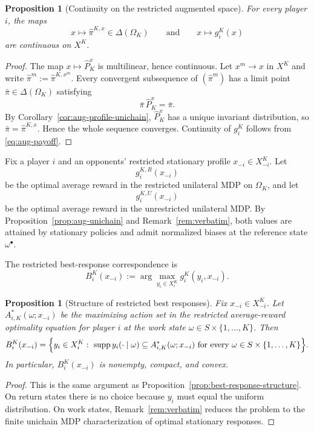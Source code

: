 \documentclass[11pt]{article}
\newtheorem{proposition}[theorem]{Proposition}
\theoremstyle{definition}
\newcommand{\1}{\mathbf{1}}
\DeclareMathOperator{\supp}{supp}
\begin{document}
\begin{proposition}[Continuity on the restricted augmented space]\label{prop:aug-continuity}
For every player $i$, the maps
\[
x\longmapsto \widehat\pi^{K,x}\in\Delta(\Omega_K)
\qquad\text{and}\qquad
x\longmapsto g_i^K(x)
\]
are continuous on $X^K$.
\end{proposition}

\begin{proof}
The map $x\mapsto \widehat P_K^x$ is multilinear, hence continuous. Let $x^m\to x$ in $X^K$ and write $\widehat\pi^m:=\widehat\pi^{K,x^m}$. Every convergent subsequence of $(\widehat\pi^m)$ has a limit point $\bar\pi\in\Delta(\Omega_K)$ satisfying
\[
\bar\pi\,\widehat P_K^x=\bar\pi.
\]
By Corollary~\ref{cor:aug-profile-unichain}, $\widehat P_K^x$ has a unique invariant distribution, so $\bar\pi=\widehat\pi^{K,x}$. Hence the whole sequence converges. Continuity of $g_i^K$ follows from \eqref{eq:aug-payoff}.
\end{proof}

Fix a player $i$ and an opponents' restricted stationary profile $x_{-i}\in X_{-i}^K$. Let
\[
g_i^{K,R}(x_{-i})
\]
be the optimal average reward in the restricted unilateral MDP on $\Omega_K$, and let
\[
g_i^{K,U}(x_{-i})
\]
be the optimal average reward in the unrestricted unilateral MDP. By Proposition~\ref{prop:aug-unichain} and Remark~\ref{rem:verbatim}, both values are attained by stationary policies and admit normalized biases at the reference state $\omega^\bullet$.

The restricted best-response correspondence is
\[
B_i^K(x_{-i}):=\arg\max_{y_i\in X_i^K}g_i^K(y_i,x_{-i}).
\]

\begin{proposition}[Structure of restricted best responses]\label{prop:aug-br-structure}
Fix $x_{-i}\in X_{-i}^K$. Let $A_{i,K}^{*}(\omega;x_{-i})$ be the maximizing action set in the restricted average-reward optimality equation for player $i$ at the work state $\omega\in S\times\{1,\dots,K\}$. Then
\[
B_i^K(x_{-i})
=
\Bigl\{y_i\in X_i^K:\ \supp y_i(\cdot\mid \omega)\subseteq A_{i,K}^{*}(\omega;x_{-i})
\text{ for every }\omega\in S\times\{1,\dots,K\}\Bigr\}.
\]
In particular, $B_i^K(x_{-i})$ is nonempty, compact, and convex.
\end{proposition}

\begin{proof}
This is the same argument as Proposition~\ref{prop:best-response-structure}. On return states there is no choice because $y_i$ must equal the uniform distribution. On work states, Remark~\ref{rem:verbatim} reduces the problem to the finite unichain MDP characterization of optimal stationary responses.
\end{proof}
\end{document}
